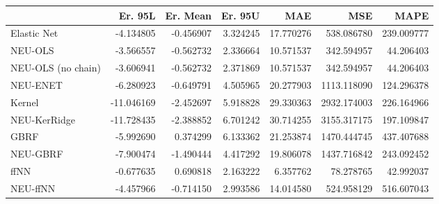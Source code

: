 \begin{tabular}{lrrrrrr}
\toprule
{} &    Er. 95L &  Er. Mean &   Er. 95U &        MAE &          MSE &        MAPE \\
\midrule
Elastic Net        &  -4.134805 & -0.456907 &  3.324245 &  17.770276 &   538.086780 &  239.009777 \\
NEU-OLS            &  -3.566557 & -0.562732 &  2.336664 &  10.571537 &   342.594957 &   44.206403 \\
NEU-OLS (no chain) &  -3.606941 & -0.562732 &  2.371869 &  10.571537 &   342.594957 &   44.206403 \\
NEU-ENET           &  -6.280923 & -0.649791 &  4.505965 &  20.277903 &  1113.118090 &  124.296378 \\
Kernel             & -11.046169 & -2.452697 &  5.918828 &  29.330363 &  2932.174003 &  226.164966 \\
NEU-KerRidge       & -11.728435 & -2.388852 &  6.701242 &  30.714255 &  3155.317175 &  197.109847 \\
GBRF               &  -5.992690 &  0.374299 &  6.133362 &  21.253874 &  1470.444745 &  437.407688 \\
NEU-GBRF           &  -7.900474 & -1.490444 &  4.417292 &  19.806078 &  1437.716842 &  243.092452 \\
ffNN               &  -0.677635 &  0.690818 &  2.163222 &   6.357762 &    78.278765 &   42.992037 \\
NEU-ffNN           &  -4.457966 & -0.714150 &  2.993586 &  14.014580 &   524.958129 &  516.607043 \\
\bottomrule
\end{tabular}
